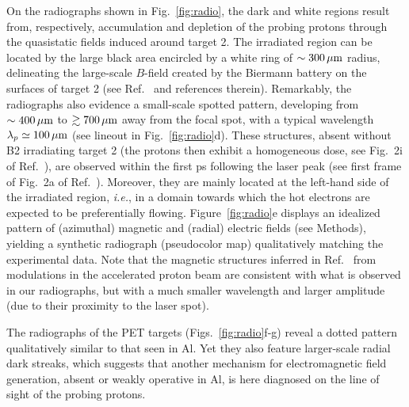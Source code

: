 \documentclass[aps,twocolumn,showpacs,superscriptaddress]{revtex4}
\begin{document}
On the radiographs shown in Fig.~\ref{fig:radio}, the dark and white regions result from, respectively, accumulation and depletion of the probing protons through the quasistatic fields induced around target 2. The irradiated region can be located by the large black area encircled by a white ring of $\sim 300\,\rm \mu m$ radius, delineating the large-scale $B$-field created by the Biermann battery on the surfaces of target 2 (see Ref.~\cite{RSI_Albertazzi_2015} and references therein). 
Remarkably, the radiographs also evidence a small-scale spotted pattern, developing from $\sim 400\,\rm\mu m$ to $\gtrsim 700\,\rm \mu m$ away from the focal spot, with a typical wavelength  $\lambda_p \simeq 100\,\rm \mu m$ (see lineout in Fig.~\ref{fig:radio}d).
These structures, absent without B2 irradiating target 2 (the protons then exhibit a homogeneous dose, see Fig.~2i of Ref.~\cite{RSI_Albertazzi_2015}), are observed within the first ps following the laser peak (see first frame of Fig.~2a of Ref.~\cite{RSI_Albertazzi_2015}). Moreover, they are mainly located at the left-hand side of the irradiated region, \emph{i.e.}, in a domain towards which the hot electrons are expected to be preferentially flowing. Figure~\ref{fig:radio}e displays an idealized pattern of (azimuthal) magnetic and (radial) electric fields (see Methods), yielding a synthetic radiograph (pseudocolor map) qualitatively matching the experimental data. Note that the magnetic structures inferred in Ref.~\cite{PRL_Gode_2017} from modulations in the accelerated proton beam are consistent with what is observed in our radiographs, but with a much smaller wavelength and larger amplitude (due to their proximity to the laser spot).

The radiographs of the PET targets (Figs.~\ref{fig:radio}f-g) reveal a dotted pattern qualitatively similar to that seen in Al. Yet they also feature larger-scale radial dark streaks, which suggests that another mechanism for electromagnetic field generation, absent or weakly operative in Al, is here diagnosed on the line of sight of the probing protons.
\end{document}
